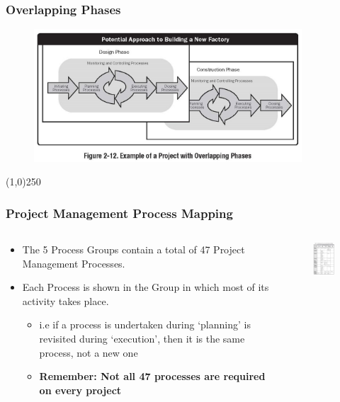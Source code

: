 \begin{frame}
\frametitle{Overlapping Phases}
 \begin{figure}
 	\centering
 		\includegraphics[width = 10cm]{images/Fig2-12.jpg}
 	\label{fig:2-12}
 \end{figure}
\end{frame}
\begin{center}\line(1,0){250}\end{center}
\begin{frame}
\frametitle{Project Management Process Mapping}
\begin{columns}
		\begin{column}{0.6\textwidth}		
			\begin{itemize}
				\item The 5 Process Groups contain a total of 47 Project Management Processes.\\
				\item Each Process is shown in the Group in which most of its activity takes place.\\
					\begin{itemize}
						\item i.e if a process is undertaken during `planning' is revisited during `execution', then it is the same process, not a new one
						\item \textbf{Remember: Not all 47 processes are required on every project}
					\end{itemize}
			\end{itemize}
		\end{column}	
			
		\begin{column}{0.4\textwidth}	
			\begin{figure}
				\centering
					\includegraphics[width = 4cm]{images/tbl3-1.jpg}
				\label{tbl:3-1}
			\end{figure}
		\end{column}
\end{columns}

\end{frame}
